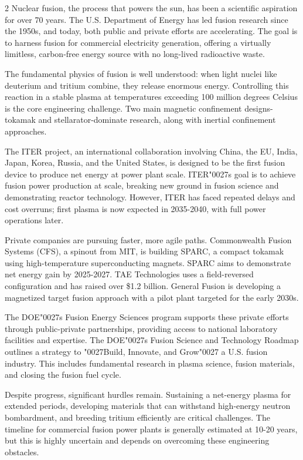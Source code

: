 \documentclass[10pt,a4paper]{article}
\newcommand{\BOApos}{{\BOQuoteFont\char"0027}}
\begin{document}
\begin{multicols}{2}
{\small Nuclear fusion, the process that powers the sun, has been a scientific aspiration for over 70 years. The U.S. Department of Energy has led fusion research since the 1950s, and today, both public and private efforts are accelerating. The goal is to harness fusion for commercial electricity generation, offering a virtually limitless, carbon-free energy source with no long-lived radioactive waste.}\par
{\small The fundamental physics of fusion is well understood: when light nuclei like deuterium and tritium combine, they release enormous energy. Controlling this reaction in a stable plasma at temperatures exceeding 100 million degrees Celsius is the core engineering challenge. Two main magnetic confinement designs-tokamak and stellarator-dominate research, along with inertial confinement approaches.}\par
{\small The ITER project, an international collaboration involving China, the EU, India, Japan, Korea, Russia, and the United States, is designed to be the first fusion device to produce net energy at power plant scale. ITER\BOApos{}s goal is to achieve fusion power production at scale, breaking new ground in fusion science and demonstrating reactor technology. However, ITER has faced repeated delays and cost overruns; first plasma is now expected in 2035-2040, with full power operations later.}\par
{\small Private companies are pursuing faster, more agile paths. Commonwealth Fusion Systems (CFS), a spinout from MIT, is building SPARC, a compact tokamak using high-temperature superconducting magnets. SPARC aims to demonstrate net energy gain by 2025-2027. TAE Technologies uses a field-reversed configuration and has raised over \$1.2 billion. General Fusion is developing a magnetized target fusion approach with a pilot plant targeted for the early 2030s.}\par
{\small The DOE\BOApos{}s Fusion Energy Sciences program supports these private efforts through public-private partnerships, providing access to national laboratory facilities and expertise. The DOE\BOApos{}s Fusion Science and Technology Roadmap outlines a strategy to \BOApos{}Build, Innovate, and Grow\BOApos{} a U.S. fusion industry. This includes fundamental research in plasma science, fusion materials, and closing the fusion fuel cycle.}\par
{\small Despite progress, significant hurdles remain. Sustaining a net-energy plasma for extended periods, developing materials that can withstand high-energy neutron bombardment, and breeding tritium efficiently are critical challenges. The timeline for commercial fusion power plants is generally estimated at 10-20 years, but this is highly uncertain and depends on overcoming these engineering obstacles.}\par

\end{multicols}
\end{document}
